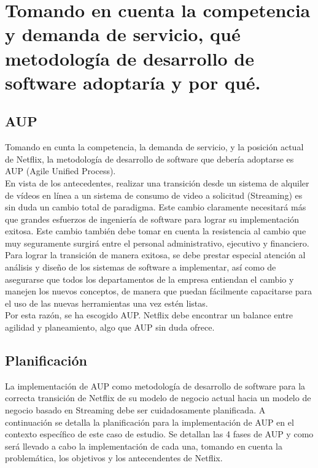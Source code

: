 \documentclass{article}
\begin{document}
\section{Tomando en cuenta la competencia y demanda de servicio,
      qué metodología de desarrollo de software adoptaría
      y por qué.}
\subsection{AUP}
Tomando en cunta la competencia, la demanda de servicio, y la 
posición actual de Netflix, la metodología de desarrollo de software 
que debería adoptarse es AUP (Agile Unified Process). \\
En vista de los antecedentes, realizar una transición 
desde un sistema de alquiler de vídeos en línea a un sistema de
consumo de video a solicitud (Streaming) es sin duda un cambio total
de paradigma. Este cambio claramente necesitará más que grandes 
esfuerzos de ingeniería de software para lograr su implementación
exitosa.  Este cambio también debe tomar en cuenta la resistencia
al cambio que muy seguramente surgirá entre el personal
administrativo, ejecutivo y financiero. Para lograr la transición
de manera exitosa, se debe prestar especial atención al análisis
y diseño de los sistemas de software a implementar, así como de 
asegurarse que todos los departamentos de la empresa entiendan
el cambio y manejen los nuevos conceptos, de manera que 
puedan fácilmente capacitarse para el uso de las nuevas
herramientas una vez estén listas. \\
Por esta razón, se ha escogido AUP. Netflix debe encontrar un 
balance entre agilidad y planeamiento, algo que AUP sin duda ofrece.
\subsection{Planificación}
La implementación de AUP como metodología de desarrollo de
software para la correcta transición de Netflix de su modelo
de negocio actual hacia un modelo de negocio basado en Streaming
debe ser cuidadosamente planificada. A continuación se detalla la
planificación para la implementación de AUP en el contexto específico
de este caso de estudio. Se detallan las 4 fases de AUP y como 
será llevado a cabo la implementación de cada una, tomando en cuenta
la problemática, los objetivos y los antecendentes de Netflix.
\end{document}
